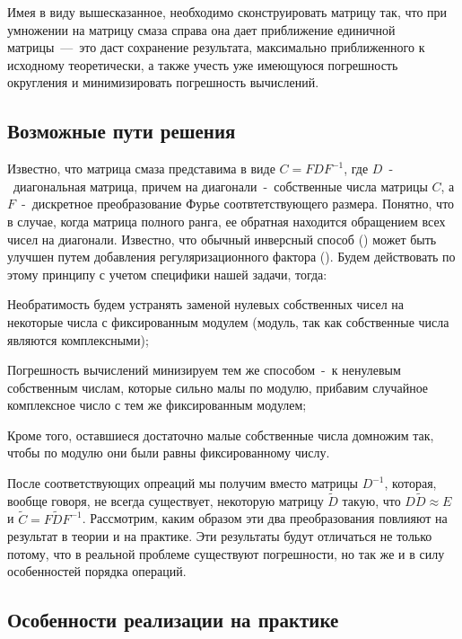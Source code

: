 \documentclass[a4paper]{article}
\theoremstyle{definition}
\newcounter{qcounter}
\begin{document}
    Имея в виду вышесказанное, необходимо сконструировать матрицу так, что при умножении на матрицу смаза справа она дает приближение единичной матрицы~---~это даст сохранение результата, максимально приближенного к исходному теоретически, а также учесть уже имеющуюся погрешность округления и минимизировать погрешность вычислений.


    \subsection{Возможные пути решения}


    Известно, что матрица смаза представима в виде $C = FDF^{-1}$, где $D$~-~диагональная матрица, причем на диагонали~-~собственные числа матрицы $C$, а $F$~-~дискретное преобразование Фурье соотвтетствующего размера. Понятно, что в случае, когда матрица полного ранга, ее обратная находится обращением всех чисел на диагонали. Известно, что обычный инверсный способ (\cite{model_proc}) может быть улучшен путем добавления регуляризационного фактора (\cite{addition}). Будем действовать по этому принципу с учетом специфики нашей задачи, тогда:


    \begin{list}{)~}{}
        \item Необратимость будем устранять заменой нулевых собственных чисел на некоторые числа с фиксированным модулем (модуль, так как собственные числа являются комплексными);
        \item Погрешность вычислений минизируем тем же способом~-~к ненулевым собственным числам, которые сильно малы по модулю, прибавим случайное комплексное число с тем же фиксированным модулем;
        \item Кроме того, оставшиеся достаточно малые собственные числа домножим так, чтобы по модулю они были равны фиксированному числу.
    \end{list}



    После соответствующих опреаций мы получим вместо матрицы $D^{-1}$, которая, вообще говоря, не всегда существует, некоторую матрицу $\tilde{D}$ такую, что $D\tilde{D} \approx E$ и $\tilde{C} = F\tilde{D}F^{-1}$. Рассмотрим, каким образом эти два преобразования повлияют на результат в теории и на практике. Эти результаты будут отличаться не только потому, что в реальной проблеме существуют погрешности, но так же и в силу особенностей порядка операций.


    \subsection{Особенности реализации на практике}
\end{document}
